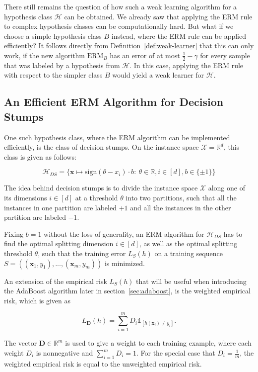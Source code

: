 There still remains the question of how such a weak learning algorithm for a hypothesis class $\mathcal{H}$
can be obtained.
We already saw that applying the ERM rule to complex hypothesis classes can be computationally hard.
But what if we choose a simple hypothesis class $B$ instead, where the ERM rule can be applied efficiently?
It follows directly from Definition~\ref{def:weak-learner} that this can only work, if the new algorithm
$\text{ERM}_B$ has an error of at most $\frac{1}{2} - \gamma$ for every sample that was labeled by a hypothesis from
$\mathcal{H}$. In this case, applying the ERM rule with respect to the simpler class $B$ would yield a weak learner
for $\mathcal{H}$.

\subsection{An Efficient ERM Algorithm for Decision Stumps}

One such hypothesis class, where the ERM algorithm can be implemented efficiently, is the class of decision stumps.
On the instance space $\mathcal{X} = \mathbb{R}^d$,  this class is given as follows:
\begin{linenomath*}
    $$\mathcal{H}_{DS} = \{ \mathbf{x} \mapsto \text{sign}\left( \theta - x_i \right) \cdot b: \ 
        \theta \in \mathbb{R}, i \in \left[ d \right], b \in \{ \pm 1 \} \}$$
\end{linenomath*}

The idea behind decision stumps is to divide the instance space $\mathcal{X}$ along one of its dimensions
$i \in \left[ d \right]$ at a threshold $\theta$ into two partitions, 
such that all the instances in one partition are labeled
$+1$ and all the instances in the other partition are labeled $-1$.

Fixing $b=1$ without the loss of generality,
an ERM algorithm for $\mathcal{H}_{DS}$ has to find the optimal splitting dimension $i \in \left[ d \right]$, as well
as the optimal splitting threshold $\theta$, such that the training error $L_S(h)$ on a training sequence
$S = \left( (\mathbf{x}_1, y_1),...,(\mathbf{x}_m, y_m) \right)$ is minimized.

An extension of the empirical risk $L_S(h)$ that will be useful when introducing the AdaBoost algorithm later in
section~\ref{sec:adaboost}, is the weighted empirical risk, which is given as
\begin{linenomath*}
    $$L_\mathbf{D}(h) = \sum_{i=1}^{m} D_i \mathds{1}_{\left[ h(\mathbf{x}_i) \neq y_i \right]}.$$
\end{linenomath*}
The vector $\mathbf{D} \in \mathbb{R}^m$ is used to give a weight to each training example, where each
weight $D_i$ is nonnegative and $\sum_{i=1}^m D_i = 1$. For the special case that $D_i = \frac{1}{m}$, the
weighted empirical risk is equal to the unweighted empirical risk.

